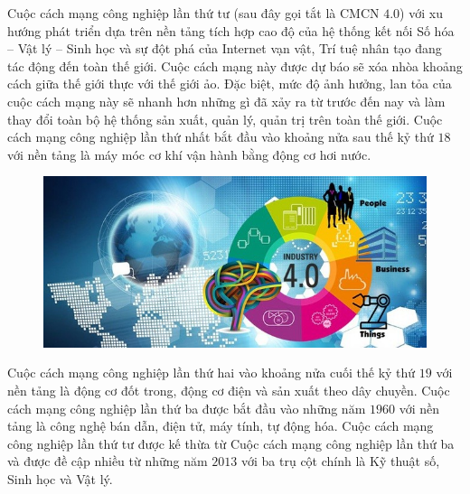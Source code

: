 \vspace*{185pt}
\begin{multicols}{2}
	Cuộc cách mạng công nghiệp lần thứ tư (sau đây gọi tắt là CMCN $4{.}0$) với xu hướng phát triển dựa trên nền tảng tích hợp cao độ của hệ thống kết nối Số hóa -- Vật lý -- Sinh học và sự đột phá của Internet vạn vật, Trí tuệ nhân tạo đang tác động đến toàn thế giới. Cuộc cách mạng này được dự báo sẽ xóa nhòa khoảng cách giữa thế giới thực với thế giới ảo. Đặc biệt, mức độ ảnh hưởng, lan tỏa của cuộc cách mạng này sẽ nhanh hơn những gì đã xảy ra từ trước đến nay và làm thay đổi toàn bộ hệ thống sản xuất, quản lý, quản trị trên toàn thế giới. Cuộc cách mạng công nghiệp lần thứ nhất bắt đầu vào khoảng nửa sau thế kỷ thứ $18$ với nền tảng là máy móc cơ khí vận hành bằng động cơ hơi nước.
	\begin{figure}[H]
		\vspace*{-5pt}
		\centering
		\captionsetup{labelformat= empty, justification=centering}
		\includegraphics[width= 1\linewidth]{1a}
		\vspace*{-15pt}
	\end{figure}
	Cuộc cách mạng công nghiệp lần thứ hai vào khoảng nửa cuối thế kỷ thứ $19$ với nền tảng là động cơ đốt trong, động cơ điện và sản xuất theo dây chuyền. Cuộc cách mạng công nghiệp lần thứ ba được bắt đầu vào những năm $1960$ với nền tảng là công nghệ bán dẫn, điện tử, máy tính, tự động hóa. Cuộc cách mạng công nghiệp lần thứ tư được kế thừa từ Cuộc  cách mạng công nghiệp lần thứ ba và được đề cập nhiều từ những năm $2013$ với ba trụ cột chính là Kỹ thuật số, Sinh học và Vật lý.
	

\end{multicols}
